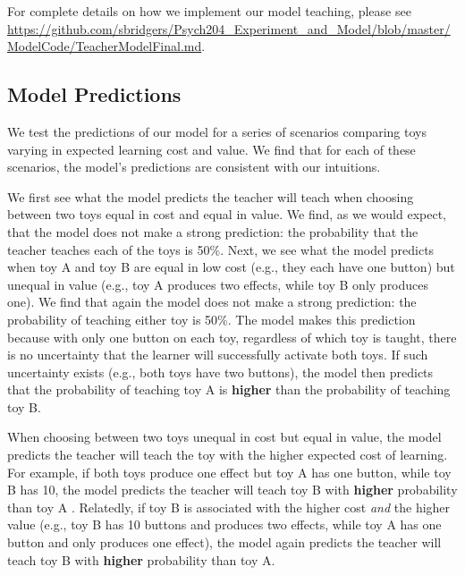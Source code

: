 \documentclass[10pt,letterpaper]{article}
\begin{document}
For complete details on how we implement our model teaching, please see \url{https://github.com/sbridgers/Psych204_Experiment_and_Model/blob/master/ModelCode/TeacherModelFinal.md}.

\subsection{Model Predictions}

We test the predictions of our model for a series of scenarios comparing toys varying in expected learning cost and value. We find that for each of these scenarios, the model's predictions are consistent with our intuitions. 

We first see what the model predicts the teacher will teach when choosing between two toys equal in cost and equal in value. We find, as we would expect, that the model does not make a strong prediction: the probability that the teacher teaches each of the toys is 50\%. Next, we see what the model predicts when toy A and toy B are equal in low cost (e.g., they each have one button) but unequal in value (e.g., toy A produces two effects, while toy B only produces one). We find that again the model does not make a strong prediction: the probability of teaching either toy is 50\%. The model makes this prediction because with only one button on each toy, regardless of which toy is taught, there is no uncertainty that the learner will successfully activate both toys. If such uncertainty exists (e.g., both toys have two buttons), the model then predicts that the probability of teaching toy A is \textbf{higher} than the probability of teaching toy B. 

When choosing between two toys unequal in cost but equal in value, the model predicts the teacher will teach the toy with the higher expected cost of learning. For example, if both toys produce one effect but toy A has one button, while toy B has 10, the model predicts the teacher will teach toy B with \textbf{higher} probability than toy A . Relatedly, if toy B is associated with the higher cost \textit{and} the higher value (e.g., toy B has 10 buttons and produces two effects, while toy A has one button and only produces one effect), the model again predicts the teacher will teach toy B with \textbf{higher} probability than toy A.
\end{document}
